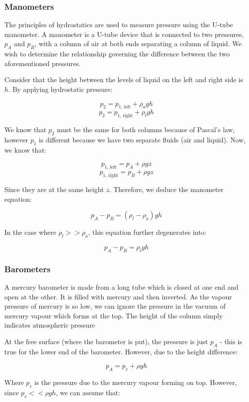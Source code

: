 \documentclass{article}
\begin{document}
\subsubsection{Manometers}

The principles of hydrostatics are used to measure pressure using the U-tube manometer. A manometer is a U-tube device that is connected to two pressures, $p_A$ and $p_B$, with a column of air at both ends separating a column of liquid. We wish to determine the relationship governing the difference between the two aforementioned pressures.

Consider that the height between the levels of liquid on the left and right side is $h$. By applying hydrostatic pressure:

\[ p_2 = p_{\text{1, left}} + \rho_agh \]
\[ p_2 = p_{\text{1, right}} +\rho_lgh \]

We know that $p_2$ must be the same for both columns because of Pascal's law, however $p_1$ is different because we have two separate fluids (air and liquid). Now, we know that:

\[ p_{\text{1, left}} = p_A + \rho gz \]
\[ p_{\text{1, right}} = p_B + \rho gz \]

Since they are at the same height $z$. Therefore, we deduce the manometer equation:

\[ p_A - p_B = (\rho_l - \rho_a)gh \]

In the case where $\rho_l >> \rho_a$, this equation further degenerates into:

\[ p_A - p_B = \rho_lgh \]

\subsubsection{Barometers}

A mercury barometer is made from a long tube which is closed at one end and open at the other. It is filled with mercury and then inverted. As the vapour pressure of mercury is so low, we can ignore the pressure in the vacuum of mercury vapour which forms at the top. The height of the column simply indicates atmospheric pressure

At the free surface (where the barometer is put), the pressure is just $p_A$ - this is true for the lower end of the barometer. However, due to the height difference:

\[  p_A = p_v + \rho gh\]

Where $p_v$ is the pressure due to the mercury vapour forming on top. However, since $p_v << \rho gh$, we can assume that:
\end{document}
